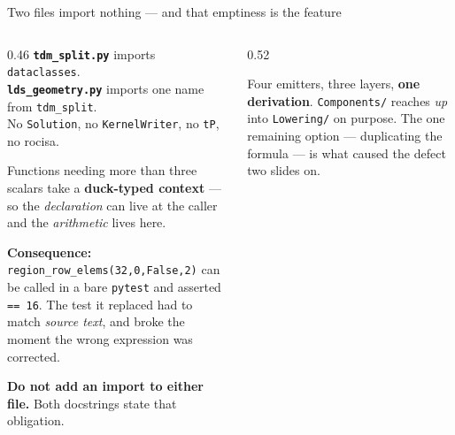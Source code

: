 \documentclass[aspectratio=169,9pt]{beamer}
\newcommand{\tsub}[1]{{\footnotesize\color{gray}#1}}
\newcommand{\key}[1]{\textcolor{acc}{\textbf{#1}}}
\newcommand{\bad}[1]{\textcolor{warn}{\textbf{#1}}}
\newcommand{\good}[1]{\textcolor{ok}{\textbf{#1}}}
\begin{document}
\begin{frame}{Two files import nothing --- and that emptiness is the feature}

\begin{columns}[T]
\begin{column}{0.46\textwidth}
\footnotesize
\key{\texttt{tdm\_split.py}} imports \texttt{dataclasses}. \\
\key{\texttt{lds\_geometry.py}} imports one name from \texttt{tdm\_split}. \\
No \texttt{Solution}, no \texttt{KernelWriter}, no \texttt{tP}, no rocisa.

\medskip
Functions needing more than three scalars take a \key{duck-typed context} --- so the
\emph{declaration} can live at the caller and the \emph{arithmetic} lives here.

\medskip
\good{Consequence:} \texttt{region\_row\_elems(32,0,False,2)} can be called in a bare
\texttt{pytest} and asserted \texttt{== 16}. The test it replaced had to match \emph{source
text}, and broke the moment the wrong expression was corrected.

\medskip
\bad{Do not add an import to either file.} Both docstrings state that obligation.
\end{column}

\begin{column}{0.52\textwidth}
\centering
{}

\smallskip
\footnotesize
Four emitters, three layers, \key{one derivation}. \texttt{Components/} reaches \emph{up} into
\texttt{Lowering/} on purpose. The one remaining option --- duplicating the formula --- is what
caused the defect two slides on.
\end{column}
\end{columns}
\end{frame}
\end{document}
